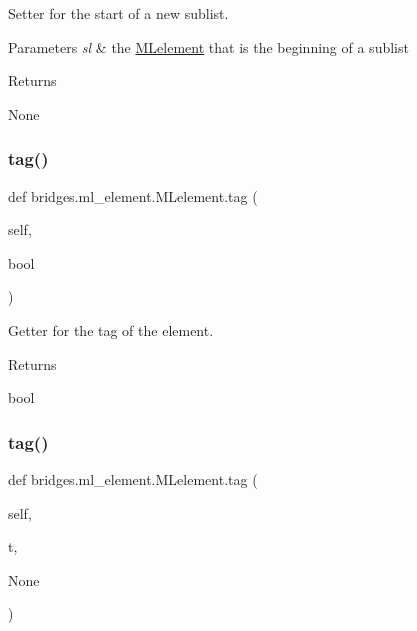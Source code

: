 Setter for the start of a new sublist. 


\begin{DoxyParams}{Parameters}
{\em sl} & the \hyperlink{classbridges_1_1ml__element_1_1_m_lelement}{M\+Lelement} that is the beginning of a sublist \\
\hline
\end{DoxyParams}
\begin{DoxyReturn}{Returns}


None 
\end{DoxyReturn}
\mbox{\label{classbridges_1_1ml__element_1_1_m_lelement_a805f6b6f24ec9c5518c298320742a8d6}} 
\subsubsection{\texorpdfstring{tag()}{tag()}\hspace{0.1cm}{\footnotesize\ttfamily [1/2]}}
{\footnotesize\ttfamily def bridges.\+ml\+\_\+element.\+M\+Lelement.\+tag (\begin{DoxyParamCaption}\item[{}]{self,  }\item[{}]{bool }\end{DoxyParamCaption})}



Getter for the tag of the element. 

\begin{DoxyReturn}{Returns}


bool 
\end{DoxyReturn}
\mbox{\label{classbridges_1_1ml__element_1_1_m_lelement_aaae13135b666038dee8a843cd32b03b1}} 
\subsubsection{\texorpdfstring{tag()}{tag()}\hspace{0.1cm}{\footnotesize\ttfamily [2/2]}}
{\footnotesize\ttfamily def bridges.\+ml\+\_\+element.\+M\+Lelement.\+tag (\begin{DoxyParamCaption}\item[{}]{self,  }\item[{}]{t,  }\item[{}]{None }\end{DoxyParamCaption})}




